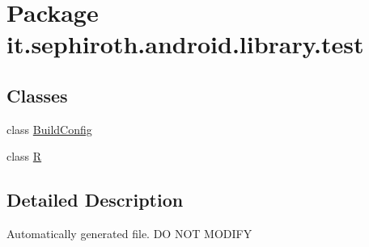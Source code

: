 \hypertarget{namespaceit_1_1sephiroth_1_1android_1_1library_1_1test}{}\section{Package it.\+sephiroth.\+android.\+library.\+test}
\label{namespaceit_1_1sephiroth_1_1android_1_1library_1_1test}
\subsection*{Classes}
\begin{DoxyCompactItemize}
\item 
class \hyperlink{classit_1_1sephiroth_1_1android_1_1library_1_1test_1_1_build_config}{Build\+Config}
\item 
class \hyperlink{classit_1_1sephiroth_1_1android_1_1library_1_1test_1_1_r}{R}
\end{DoxyCompactItemize}


\subsection{Detailed Description}
Automatically generated file. DO N\+OT M\+O\+D\+I\+FY 